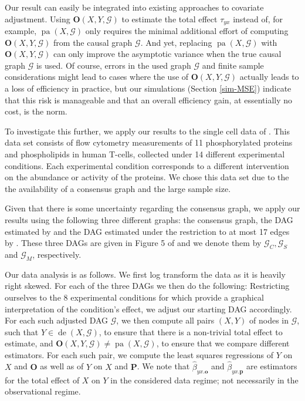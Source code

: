 \documentclass[11pt,a4paper]{article}
\theoremstyle{definition}
\theoremstyle{remark}
\DeclareMathOperator{\pa}{pa}
\DeclareMathOperator{\de}{de}
\newcommand{\g}[1][G]{\mathcal{#1}}
\newcommand{\opt}[2][X,Y]{\mathbf{O}(#1,#2)}
\begin{document}
Our result can easily be integrated into existing approaches to covariate adjustment. Using $\opt{\g}$ to estimate the total effect $\tau_{yx}$  instead of, for example, $\pa(X,\g)$ only requires the minimal additional effort of computing $\opt{\g}$ from the causal graph $\g$. And yet, replacing $\pa(X,\g)$ with $\opt{\g}$ can only improve the asymptotic variance when the true causal graph $\g$ is used. 
Of course, errors in the used graph $\g$ and finite sample considerations might lead to cases where the use of $\opt{\g}$ actually leads to a loss of efficiency in practice, but our simulations (Section \ref{sim-MSE}) indicate that this risk is manageable and that an overall efficiency gain, at essentially no cost, is the norm. 


To investigate this further, we apply our results to the single cell data of \citet{sachs2005causal}. This data set consists of flow cytometry measurements of 11 phosphorylated proteins and phospholipids in human T-cells, collected under 14 different experimental conditions. Each experimental condition corresponds to a different intervention on the abundance or activity of the proteins. We chose this data set due to the the availability of a consensus graph \citep[see Figure Figure 5.a) in][]{mooij2013cyclic} and the large sample size.

Given that there is some uncertainty regarding the consensus graph, we apply our results using the following three different graphs: the consensus graph, the DAG estimated by \citet{sachs2005causal} and the DAG estimated under the restriction to at most 17 edges by \citet{mooij2013cyclic}. These three DAGs are given in Figure 5 of \citet{mooij2013cyclic} and we 
denote them by $\g_C,\g_S$ and $\g_M$, respectively.

Our data analysis is as follows. We first log transform the data as it is heavily right skewed. For each of the three DAGs we then do the following: Restricting ourselves to the 8 experimental conditions for which \citet{mooij2013cyclic} provide a graphical interpretation of the condition's effect, we adjust our starting DAG accordingly. For each such adjusted DAG $\g$, we then compute all pairs $(X,Y)$ of nodes in $\g$, such that $Y \in \de(X,\g)$, to ensure that there is a non-trivial total effect to estimate, and $\opt{\g} \neq \pa(X,\g)$, to ensure that we compare different estimators. For each such pair, we compute the least squares regressions of $Y$ on $X$ and $\mathbf{O}$ as well as of $Y$ on $X$ and $\mathbf{P}$. We note that $\hat{\beta}_{yx.\mathbf{o}}$ and $\hat{\beta}_{yx.\mathbf{p}}$ are estimators for the total effect of $X$ on $Y$ in the considered data regime; not necessarily in the observational regime.
\end{document}
